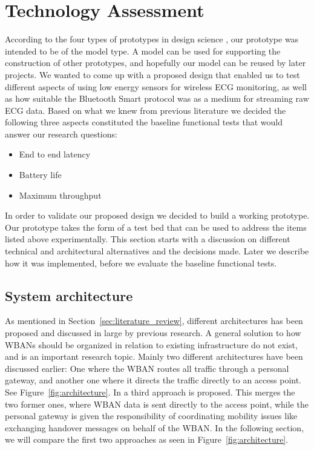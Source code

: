 \section{Technology Assessment} %
\label{sec:technology_assessment}

According to the four types of prototypes in design science \cite{Johannesson:2014co}, our prototype was intended to be of the model type. A model can be used for supporting the construction of other prototypes, and hopefully our model can be reused by later projects. We wanted to come up with a proposed design that enabled us to test different aspects of using low energy sensors for wireless ECG monitoring, as well as how suitable the Bluetooth Smart protocol was as a medium for streaming raw ECG data. Based on what we knew from previous literature we decided the following three aspects constituted the baseline functional tests that would answer our research questions:
\begin{itemize}
	
	\item End to end latency
	\item Battery life
	\item Maximum throughput
  
\end{itemize}
\noindent
In order to validate our proposed design we decided to build a working prototype. Our prototype takes the form of a test bed that can be used to address the items listed above experimentally. This section starts with a discussion on different technical and architectural alternatives and the decisions made. Later we describe how it was implemented, before we evaluate the baseline functional tests.

\subsection{System architecture} %
\label{sub:system_architecture}

As mentioned in Section~\ref{sec:literature_review}, different architectures has been proposed and discussed in large by previous research. A general solution to how WBANs should be organized in relation to existing infrastructure do not exist, and is an important research topic. Mainly two different architectures have been discussed earlier: One where the WBAN routes all traffic through a personal gateway, and another one where it directs the traffic directly to an access point. See Figure~\ref{fig:architecture}. In \cite{Shahamabadi:2013df} a third approach is proposed. This merges the two former ones, where WBAN data is sent directly to the access point, while the personal gateway is given the responsibility of coordinating mobility issues like exchanging handover messages on behalf of the WBAN. In the following section, we will compare the first two approaches as seen in Figure~\ref{fig:architecture}.


